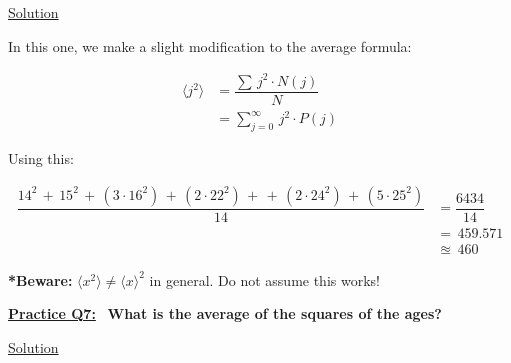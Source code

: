 \bigskip

\underline{Solution}

In this one, we make a slight modification to the average formula:

\begin{align*}
    \langle j^{2} \rangle &= \dfrac{\sum \, j^{2} \cdot N(j)}{N} \\[1.5ex]
    &= \sum_{j=0}^{\infty} \, j{^2} \cdot P(j)
\end{align*}

Using this:

\begin{align*}
    \dfrac{14^{2} \, + \, 15^{2} \, + \, (3 \cdot 16^{2}) \, + \, (2 \cdot 22^{2}) \, + \,
    + \, (2 \cdot 24^{2}) \, + \, (5 \cdot 25^{2})}{14} &= \dfrac{6434}{14} \\[1.5ex]
    &= \, 459.571 \\[1.5ex]
    &\approxeq \, \boxed{460}
\end{align*}

\bigskip

\textbf{*Beware:} $ \langle x^{2} \rangle \neq \langle x \rangle^{2}$ in general. Do not assume this works!

\bigskip \bigskip

\underline{\textbf{Practice Q7:}} \ \textbf{What is the average of the squares of the ages?}

\bigskip

\underline{Solution}
